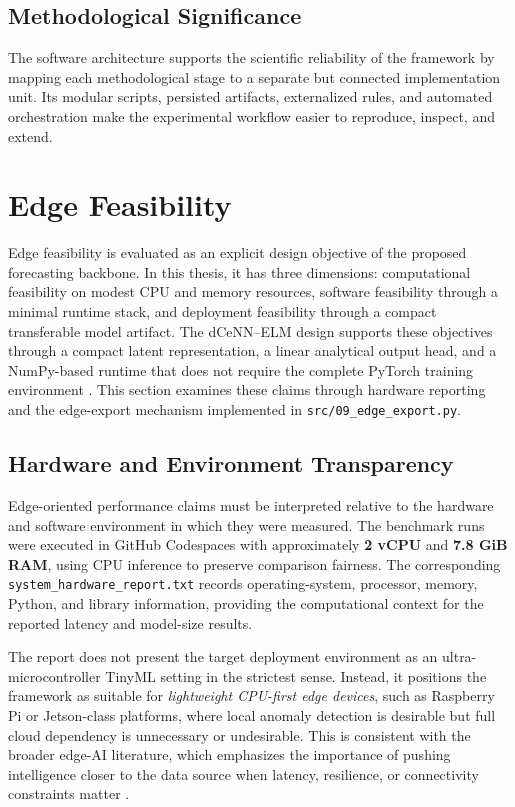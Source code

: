 \subsection{Methodological Significance}

The software architecture supports the scientific reliability of the framework by mapping each methodological stage to a separate but connected implementation unit. Its modular scripts, persisted artifacts, externalized rules, and automated orchestration make the experimental workflow easier to reproduce, inspect, and extend.


\section{Edge Feasibility}
\label{sec:edge_feasibility}

Edge feasibility is evaluated as an explicit design objective of the proposed forecasting backbone. In this thesis, it has three dimensions: computational feasibility on modest CPU and memory resources, software feasibility through a minimal runtime stack, and deployment feasibility through a compact transferable model artifact. The dCeNN--ELM design supports these objectives through a compact latent representation, a linear analytical output head, and a NumPy-based runtime that does not require the complete PyTorch training environment \cite{repo_thesis_grid_anomaly}. This section examines these claims through hardware reporting and the edge-export mechanism implemented in \texttt{src/09\_edge\_export.py}.

\subsection{Hardware and Environment Transparency}

Edge-oriented performance claims must be interpreted relative to the hardware and software environment in which they were measured. The benchmark runs were executed in GitHub Codespaces with approximately \textbf{2 vCPU} and \textbf{7.8 GiB RAM}, using CPU inference to preserve comparison fairness. The corresponding \texttt{system\_hardware\_report.txt} records operating-system, processor, memory, Python, and library information, providing the computational context for the reported latency and model-size results.

The report does not present the target deployment environment as an ultra-microcontroller TinyML setting in the strictest sense. Instead, it positions the framework as suitable for \emph{lightweight CPU-first edge devices}, such as Raspberry Pi or Jetson-class platforms, where local anomaly detection is desirable but full cloud dependency is unnecessary or undesirable. This is consistent with the broader edge-AI literature, which emphasizes the importance of pushing intelligence closer to the data source when latency, resilience, or connectivity constraints matter \cite{antonini2023tinyml,howard2017mobilenets}.

